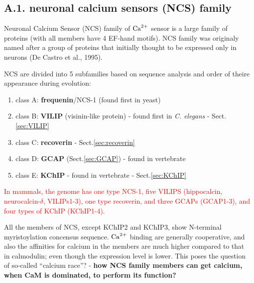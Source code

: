 \subsection{A.1. neuronal calcium sensors (NCS) family}
\label{sec:neuronal-calcium-sensor}

Neuronal Calcium Sensor (NCS) family of ${\text{Ca}^{2+}}$ sensor is a large family of
proteins (with all members have 4 EF-hand motifs). NCS family was originaly
named after a group of proteins that initially thought to be expressed only in
neurons (De Castro et al., 1995). 

NCS are divided into 5 subfamilies based on sequence analysis and order of
theire appearance during evolution:

\begin{enumerate}

  \item class A: {\bf frequenin}/NCS-1  (found first in yeast)
  
  \item class B: {\bf VILIP} (visinin-like protein) - found first in {\it C.
  elegans} - Sect.\ref{sec:VILIP}
  
  \item class C: {\bf recoverin} - Sect.\ref{sec:recoverin}
  
  \item class D: {\bf GCAP} (Sect.\ref{sec:GCAP}) - found in vertebrate
  
  \item class E: {\bf KChIP} - found in vertebrate - Sect.\ref{sec:KChIP}
\end{enumerate}

\textcolor{red}{In mammals, the genome has one type NCS-1, five VILIPS
(hippocalcin, neurocalcin-$\delta$, VILIPs1-3), one type recoverin, and three
GCAPs (GCAP1-3), and four types of KChIP (KChIP1-4).}

All the members of NCS, except KChIP2 and KChIP3, show N-terminal myristoylation
concensus sequence. ${\text{Ca}^{2+}}$ binding are generally cooperative, and also
the affinities for calcium in the members are much higher compared to that in
calmodulin; even though the expression level is lower. This poses the question
of so-called ``calcium race''? - {\bf how NCS family members can get
calcium, when CaM is dominated, to perform its function?}



